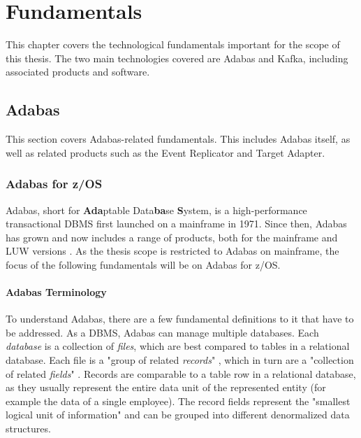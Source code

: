 \chapter{Fundamentals}
\label{ch02:fundamentals}
This chapter covers the technological fundamentals important for the scope of this thesis. The two main technologies covered are Adabas and Kafka, including associated products and software.

\section{Adabas}
\label{ch02:fundamentals:adabas}
This section covers Adabas-related fundamentals. This includes Adabas itself, as well as related products such as the Event Replicator and Target Adapter.

\subsection{Adabas for z/OS}
\label{ch02:fundamentals:adabas:forzos}
Adabas, short for \textbf{Ada}ptable Data\textbf{ba}se \textbf{S}ystem, is a high-performance transactional \ac{DBMS} first launched on a mainframe in 1971. Since then, Adabas has grown and now includes a range of products, both for the mainframe and \ac{LUW} versions \cite{adabasconcepts}. As the thesis scope is restricted to Adabas on mainframe, the focus of the following fundamentals will be on Adabas for z/OS.
\subsubsection{Adabas Terminology}
To understand Adabas, there are a few fundamental definitions to it that have to be addressed. As a \ac{DBMS}, Adabas can manage multiple databases. Each \textit{database} is a collection of \textit{files}, which are best compared to tables in a relational database. Each file is a "group of related \textit{records}" \cite{adabasconcepts}, which in turn are a "collection of related \textit{fields}" %
\cite{adabasconcepts}. Records are comparable to a table row in a relational database, as they usually represent the entire data unit of the represented entity (for example the data of a single employee). The record fields represent the "smallest logical unit of information" \cite{adabasconcepts} and can be grouped into different denormalized data structures.

